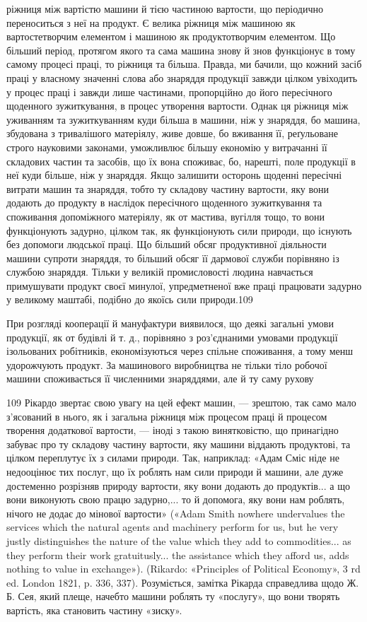 ріжниця між вартістю машини й тією частиною вартости, що
періодично переноситься з неї на продукт. Є велика ріжниця між
машиною як вартостетворчим елементом і машиною як продуктотворчим
елементом. Що більший період, протягом якого та сама
машина знову й знов функціонує в тому самому процесі праці,
то ріжниця та більша. Правда, ми бачили, що кожний засіб праці
у власному значенні слова або знаряддя продукції завжди цілком
увіходить у процес праці і завжди лише частинами, пропорційно
до його пересічного щоденного зужиткування, в процес утворення
вартости. Однак ця ріжниця між уживанням та зужиткуванням
куди більша в машини, ніж у знаряддя, бо машина, збудована
з тривалішого матеріялу, живе довше, бо вживання її, реґульоване
строго науковими законами, уможливлює більшу економію
у витрачанні її складових частин та засобів, що їх вона споживає,
бо, нарешті, поле продукції в неї куди більше, ніж у знаряддя.
Якщо залишити осторонь щоденні пересічні витрати машин та
знаряддя, тобто ту складову частину вартости, яку вони додають
до продукту в наслідок пересічного щоденного зужиткування
та споживання допоміжного матеріялу, як от мастива, вугілля
тощо, то вони функціонують задурно, цілком так, як функціонують
сили природи, що існують без допомоги людської праці.
Що більший обсяг продуктивної діяльности машини супроти
знаряддя, то більший обсяг її дармової служби порівняно із
службою знаряддя. Тільки у великій промисловості людина
навчається примушувати продукт своєї минулої, упредметненої
вже праці працювати задурно у великому маштабі, подібно до
якоїсь сили природи.109

При розгляді кооперації й мануфактури виявилося, що деякі
загальні умови продукції, як от будівлі й т. д., порівняно з роз’єднаними
умовами продукції ізольованих робітників, економізуються
через спільне споживання, а тому менш удорожчують продукт.
За машинового виробництва не тільки тіло робочої машини
споживається її численними знаряддями, але й ту саму рухову

109    Рікардо звертає свою увагу на цей ефект машин, — зрештою,
так само мало з’ясований в нього, як і загальна ріжниця між процесом
праці й процесом творення додаткової вартости, — іноді з такою винятковістю,
що принагідно забуває про ту складову частину вартости, яку
машини віддають продуктові, та цілком переплутує їх з силами природи.
Так, наприклад: «Адам Сміс ніде не недооцінює тих послуг, що їх роблять
нам сили природи й машини, але дуже достеменно розрізняв природу
вартости, яку вони додають до продуктів... а що вони виконують свою
працю задурно,... то й допомога, яку вони нам роблять, нічого не додає
до мінової вартости» («Adam Smith nowhere undervalues the services
which the natural agents and machinery perform for us, but he very justly
distinguishes the nature of the value which they add to commodities... as
they perform their work gratuitusly... the assistance which they afford
us, adds nothing to value in exchange»). (Rikardo: «Principles of
Political Economy», 3 rd ed. London 1821, p. 336, 337). Розуміється,
замітка Рікарда справедлива щодо Ж. Б. Сея, який плеще, начебто машини
роблять ту «послугу», що вони творять вартість, яка становить
частину «зиску».
